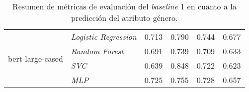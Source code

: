 \begin{table}[htpb]
{\begin{tabular}{llcccc}
        \midrule\midrule
        \multirow{4}{*}{bert-large-cased}   & \emph{Logistic Regression}  & 0.713 & 0.790 & 0.744 & 0.677\\
        \cmidrule{2-6}
                                            & \emph{Random Forest}        & 0.691 & 0.739 & 0.709 & 0.633\\
        \cmidrule{2-6}
                                            & \emph{SVC}                  & 0.639 & 0.848 & 0.722 & 0.623\\
        \cmidrule{2-6}
                                            & \emph{MLP}                  & 0.725 & 0.755 & 0.728 & 0.657\\
        \bottomrule
        \end{tabular}}
    \caption{Resumen de m\'etricas de evaluaci\'on del \emph{baseline} 1 en cuanto a la predicci\'on del atributo g\'enero.}
    \label{table:eval_baseline1_gender}
\end{table}

